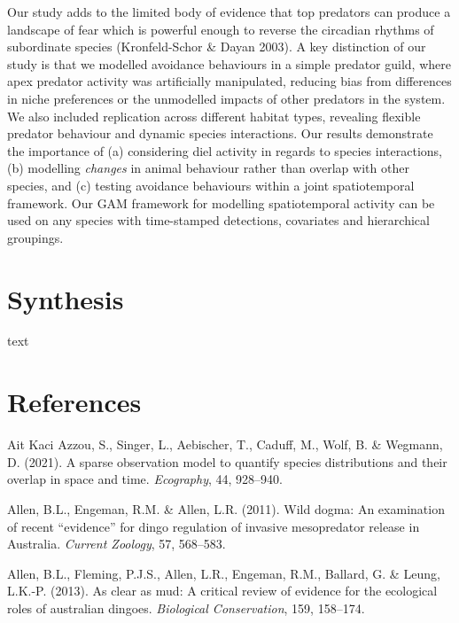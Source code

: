 \documentclass[11pt,a4paper,titlepage,twoside,openright]{style/unimelbthesis}
\begin{document}
\begin{mainmatter}
Our study adds to the limited body of evidence that top predators can produce a landscape of fear which is powerful enough to reverse the circadian rhythms of subordinate species (Kronfeld-Schor \& Dayan 2003). A key distinction of our study is that we modelled avoidance behaviours in a simple predator guild, where apex predator activity was artificially manipulated, reducing bias from differences in niche preferences or the unmodelled impacts of other predators in the system. We also included replication across different habitat types, revealing flexible predator behaviour and dynamic species interactions. Our results demonstrate the importance of (a) considering diel activity in regards to species interactions, (b) modelling \emph{changes} in animal behaviour rather than overlap with other species, and (c) testing avoidance behaviours within a joint spatiotemporal framework. Our GAM framework for modelling spatiotemporal activity can be used on any species with time-stamped detections, covariates and hierarchical groupings.

\hypertarget{synthesis}{%
\chapter{Synthesis}\label{synthesis}}

text

\hypertarget{references}{%
\chapter*{References}\label{references}}


\noindent

\setlength{\parindent}{-0.20in}
\setlength{\leftskip}{0.20in}

\hypertarget{refs}{}
\leavevmode\hypertarget{ref-azzou2021sparse}{}%
Ait Kaci Azzou, S., Singer, L., Aebischer, T., Caduff, M., Wolf, B. \& Wegmann, D. (2021). A sparse observation model to quantify species distributions and their overlap in space and time. \emph{Ecography}, 44, 928--940.

\leavevmode\hypertarget{ref-allen2011wild}{}%
Allen, B.L., Engeman, R.M. \& Allen, L.R. (2011). Wild dogma: An examination of recent ``evidence'' for dingo regulation of invasive mesopredator release in Australia. \emph{Current Zoology}, 57, 568--583.

\leavevmode\hypertarget{ref-allen2013clear}{}%
Allen, B.L., Fleming, P.J.S., Allen, L.R., Engeman, R.M., Ballard, G. \& Leung, L.K.-P. (2013). As clear as mud: A critical review of evidence for the ecological roles of australian dingoes. \emph{Biological Conservation}, 159, 158--174.


\end{mainmatter}
\end{document}
